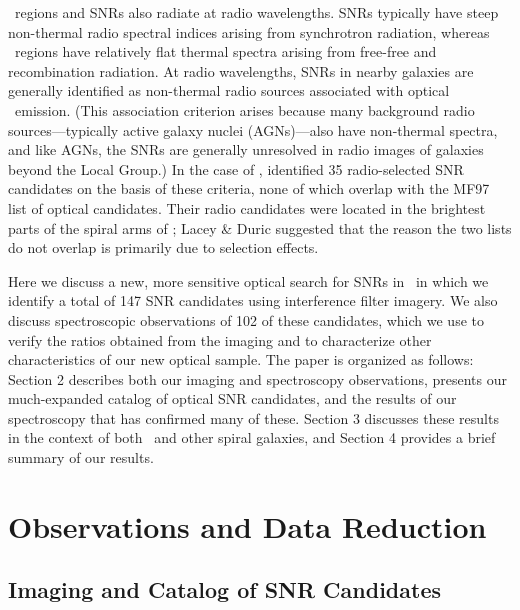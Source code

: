 \hii\ regions and SNRs also radiate at radio wavelengths.  SNRs typically have steep non-thermal radio spectral indices arising from synchrotron radiation, whereas \hii\ regions have relatively flat thermal spectra arising from free-free and recombination radiation.   At radio wavelengths, SNRs in nearby galaxies are generally identified as non-thermal radio sources associated with optical \ha\ emission.  (This association criterion arises because many background radio sources---typically active galaxy nuclei (AGNs)---also have non-thermal spectra, and like AGNs, the SNRs are generally unresolved in radio images of galaxies beyond the Local Group.)  In the case of \gal,  \cite{lacey01} identified 35 radio-selected SNR candidates on the basis of these criteria, none of which overlap with the MF97 list of optical candidates.  Their radio candidates were located in the brightest parts of the spiral arms of \gal; Lacey \& Duric suggested that the reason the two lists do not overlap is primarily due to selection effects.

Here we discuss a new, more sensitive optical search for SNRs in \gal\ in which we identify a total of 147 SNR candidates using interference filter imagery.  We also discuss spectroscopic observations of 102 of these candidates, which we use to verify the ratios obtained from the imaging and to characterize other characteristics of our new optical sample.  The paper is organized as follows:  Section 2 describes both our imaging and spectroscopy observations,  presents our much-expanded catalog of optical SNR candidates, and the results of our spectroscopy that has confirmed many of these.  Section 3 discusses these results in the context of both \gal\ and other spiral galaxies, and Section 4 provides a brief summary of our results. 


\section{Observations and Data Reduction \label{sec:observations}}
\subsection{Imaging and Catalog of SNR Candidates}

